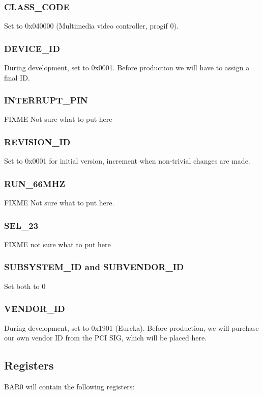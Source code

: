 \documentclass[12pt]{article}
\begin{document}
\subsubsection{CLASS\_CODE}
Set to 0x040000 (Multimedia video controller, progif 0).

\subsubsection{DEVICE\_ID}
During development, set to 0x0001. Before production we will have to assign a final ID.

\subsubsection{INTERRUPT\_PIN}
FIXME Not sure what to put here

\subsubsection{REVISION\_ID}
Set to 0x0001 for initial version, increment when non-trivial changes are made.

\subsubsection{RUN\_66MHZ}
FIXME Not sure what to put here.

\subsubsection{SEL\_23}
FIXME not sure what to put here

\subsubsection{SUBSYSTEM\_ID and SUBVENDOR\_ID}
Set both to 0

\subsubsection{VENDOR\_ID}
During development, set to 0x1901 (Eureka). Before production, we will purchase our own vendor ID from the PCI SIG, which will be placed here.

\subsection{Registers}

BAR0 will contain the following registers:
\end{document}
